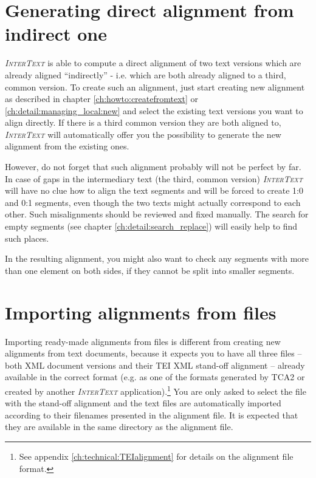 \documentclass[a4paper,10pt,oneside]{book}
\newcommand{\IT}{\textit{\textsc{InterText}}\xspace}
\begin{document}
\section{Generating direct alignment from indirect one}\label{ch:detail:managing_local:generate}

\IT is able to compute a direct alignment of two text versions which are already aligned ``indirectly'' - i.e. which are both already aligned to a third, common version. To create such an alignment, just start creating new alignment as described in chapter \ref{ch:howto:createfromtext} or \ref{ch:detail:managing_local:new} and select the existing text versions you want to align directly. If there is a third common version they are both aligned to, \IT will automatically offer you the possibility to generate the new alignment from the existing ones.

However, do not forget that such alignment probably will not be perfect by far. In case of gaps in the intermediary text (the third, common version) \IT will have no clue how to align the text segments and will be forced to create 1:0 and 0:1 segments, even though the two texts might actually correspond to each other. Such misalignments should be reviewed and fixed manually. The search for empty segments (see chapter \ref{ch:detail:search_replace}) will easily help to find such places.

In the resulting alignment, you might also want to check any segments with more than one element on both sides, if they cannot be split into smaller segments.

\section{Importing alignments from files}\label{ch:detail:managing_local:import}

Importing ready-made alignments from files is different from creating new alignments from text documents, because it expects you to have all three files -- both XML document versions and their TEI XML stand-off alignment -- already available in the correct format (e.g. as one of the formats generated by TCA2 or created by another \IT application).\footnote{See appendix \ref{ch:technical:TEIalignment} for details on the alignment file format.} You are only asked to select the file with the stand-off alignment and the text files are automatically imported according to their filenames presented in the alignment file. It is expected that they are available in the same directory as the alignment file.
\end{document}
